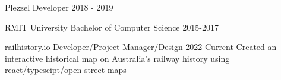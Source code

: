\documentclass[8pt]{developercv}
\begin{document}
\begin{minipage}[a]{1.0\textwidth}
\begin{entrylist}
			\entry
				{Plezzel}
				{Developer}
				{2018 - 2019}
				{}
		\end{entrylist}			
		\begin{entrylist}	%
			\entry
				{RMIT University}
				{Bachelor of Computer Science}
				{2015-2017}
				{}
		\end{entrylist}
		\begin{entrylist}	%
			\entry
				{railhistory.io}
				{Developer/Project Manager/Design}
				{2022-Current}
				{Created an interactive historical map on Australia's railway history using react/typescipt/open street maps}
		\end{entrylist}
	\end{minipage}
\end{document}
